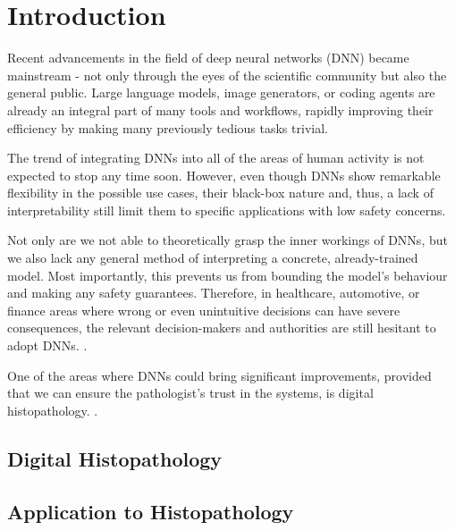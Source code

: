 \chapter{Introduction}

Recent advancements in the field of deep neural networks (DNN) became mainstream -
not only through the eyes of the scientific community but also the general public.
Large language models, image generators, or coding agents are already an integral part of many tools and workflows,
rapidly improving their efficiency by making many previously tedious tasks trivial.

The trend of integrating DNNs into all of the areas of human activity is not expected to stop any time soon.
However, even though DNNs show remarkable flexibility in the possible use cases, their black-box nature and,
thus, a lack of interpretability still limit them to specific applications with low safety concerns.

Not only are we not able to theoretically grasp the inner workings of DNNs, but we also lack
any general method of interpreting a concrete, already-trained model. Most importantly, this prevents us from
bounding the model's behaviour and making any safety guarantees. Therefore, in healthcare, automotive,
or finance areas where wrong or even unintuitive decisions can have severe consequences, the relevant
decision-makers and authorities are still hesitant to adopt DNNs.
\cite{explainable-ai-a-review-of-machine-learning-interpretability-methods}.

One of the areas where DNNs could bring significant improvements,
provided that we can ensure the pathologist's trust in the systems, is digital histopathology.
\cite{aggarwal2025artificial}.


\section{Digital Histopathology}


\section{Application to Histopathology}

